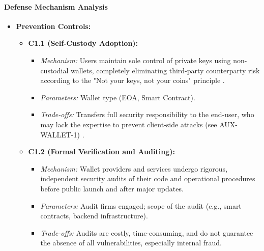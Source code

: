 \paragraph{Defense Mechanism Analysis}
\begin{itemize}
    \item \textbf{Prevention Controls:}
        \begin{itemize}
            \item \textbf{C1.1 (Self-Custody Adoption):}
                \begin{itemize}
                    \item \textit{Mechanism:} Users maintain sole control of private keys using non-custodial wallets, completely eliminating third-party counterparty risk according to the "Not your keys, not your coins" principle \cite{yu2024}.
                    \item \textit{Parameters:} Wallet type (EOA, Smart Contract).
                    \item \textit{Trade-offs:} Transfers full security responsibility to the end-user, who may lack the expertise to prevent client-side attacks (see AUX-WALLET-1) \cite{yu2024, houy2023}.
                \end{itemize}
            \item \textbf{C1.2 (Formal Verification and Auditing):}
                \begin{itemize}
                    \item \textit{Mechanism:} Wallet providers and services undergo rigorous, independent security audits of their code and operational procedures before public launch and after major updates.
                    \item \textit{Parameters:} Audit firms engaged; scope of the audit (e.g., smart contracts, backend infrastructure).
                    \item \textit{Trade-offs:} Audits are costly, time-consuming, and do not guarantee the absence of all vulnerabilities, especially internal fraud.
                \end{itemize}
        \end{itemize}


\end{itemize}
